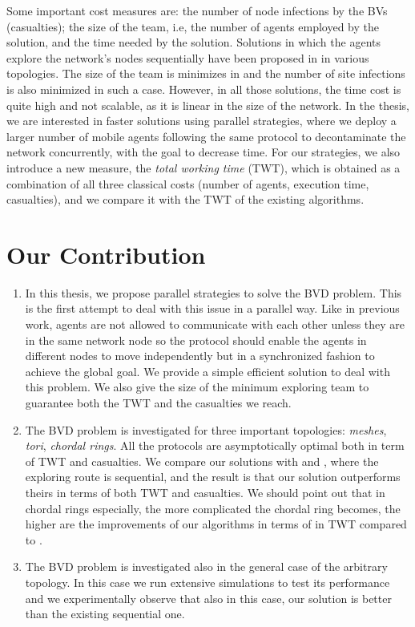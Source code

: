 Some important cost measures are: 
 the number of node infections by the BVs (casualties); 
the size of the team, i.e, the number of agents employed by the solution, and
the time needed by the solution. 
Solutions in which the agents explore the network's nodes sequentially have been proposed in \cite{alotaibi,cai,cai1} in various topologies. The size of the team is minimizes in \cite{cai,cai1} and the number of site infections is also minimized in such a case. However, in all those solutions, the time cost is quite high and not scalable, as it is linear in the size of the network.  In the thesis, we are interested in faster solutions using parallel strategies, where we deploy a larger number of mobile agents following the same protocol to decontaminate the network concurrently,  with the goal to  decrease time. For our strategies, we also introduce a new measure,   the {\em total working time} (TWT),  which is obtained as a combination of all three classical costs (number of agents,    execution time, casualties), and we compare it with the TWT of the existing algorithms.


\section{Our Contribution} 


\begin{enumerate}
\item In this thesis, we propose parallel strategies to solve the BVD problem. This is the first attempt to deal with this issue in a parallel way. Like in previous work, agents are not allowed to communicate with each other unless they are in the same network node so the protocol should enable the agents in different nodes to move independently but in  a synchronized fashion   to achieve the global goal.
We provide a simple   efficient solution to deal with this problem. 
We also give the size of the minimum exploring team  to guarantee both the TWT and the  casualties we reach.  \color{black}
\item The BVD problem is investigated for three important topologies: {\em meshes}, {\em tori}, {\em chordal rings}. All the protocols are asymptotically optimal both in term of TWT and casualties. We compare our solutions with \cite{alotaibi} and  \cite{cai}, where the exploring route is  sequential, and the result is that our solution outperforms theirs in terms of both TWT and casualties. We  should   point out that in chordal rings especially, the more complicated the chordal ring becomes, the higher are the improvements of our algorithms in terms of in TWT  compared to \cite{alotaibi}.
\item The BVD problem is investigated also in the general case of the arbitrary topology. In this case we run extensive simulations to test its performance and we experimentally observe that also in this case, our solution is better than the existing sequential one.
\end{enumerate}

